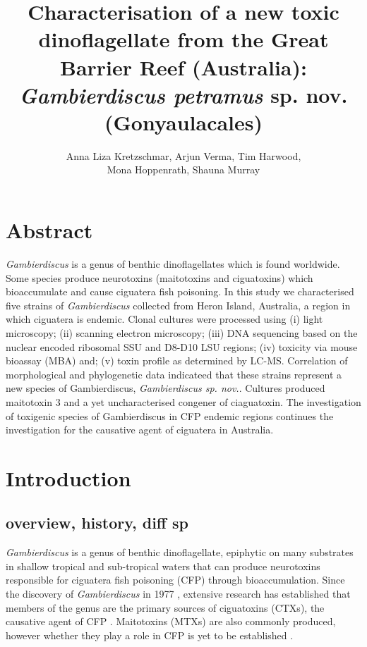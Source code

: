 \documentclass[12pt]{article}
\title{\textbf{Characterisation of a new toxic dinoflagellate from the Great Barrier Reef (Australia): \emph{Gambierdiscus petramus} sp. nov. (Gonyaulacales)}}
\author{Anna Liza Kretzschmar, Arjun Verma, Tim Harwood,\\
Mona Hoppenrath, Shauna Murray}
\date{}
\begin{document}
\maketitle
\newpage
\section{Abstract}
\textit{Gambierdiscus} is a genus of benthic dinoflagellates which is found worldwide. Some species produce neurotoxins (maitotoxins and ciguatoxins) which  bioaccumulate and cause ciguatera fish poisoning. In this study we characterised five strains of \textit{Gambierdiscus} collected from Heron Island,  Australia, a region in which ciguatera is endemic. Clonal cultures were processed using (i) light microscopy; (ii) scanning electron microscopy; (iii) DNA sequencing based on the nuclear encoded ribosomal  SSU and D8-D10 LSU regions; (iv) toxicity via mouse bioassay (MBA) and; (v) toxin profile as determined by LC-MS. Correlation of morphological and phylogenetic data indicateed that these strains represent a new species of Gambierdiscus, \emph{Gambierdiscus sp. nov.}. Cultures produced maitotoxin 3 and a yet uncharacterised congener of ciaguatoxin. The investigation of toxigenic species of Gambierdiscus in CFP endemic regions continues the investigation for the causative agent of ciguatera in Australia.
\newpage

\section{Introduction}


\subsection{overview, history, diff sp}
\emph{Gambierdiscus} is a genus of benthic dinoflagellate, epiphytic on many substrates in shallow tropical and sub-tropical waters that can produce neurotoxins responsible for ciguatera fish poisoning (CFP) through bioaccumulation. 
Since the discovery of \emph{Gambierdiscus} in 1977 \cite{yasumoto1977finding}, extensive research has established that members of the genus are the primary sources of ciguatoxins (CTXs), the causative agent of CFP \cite{chinain1997intraspecific,holmes1998gambierdiscus}. Maitotoxins (MTXs) are also commonly produced, however whether they play a role in CFP is yet to be established \cite{kohli2014feeding}. 
\end{document}
